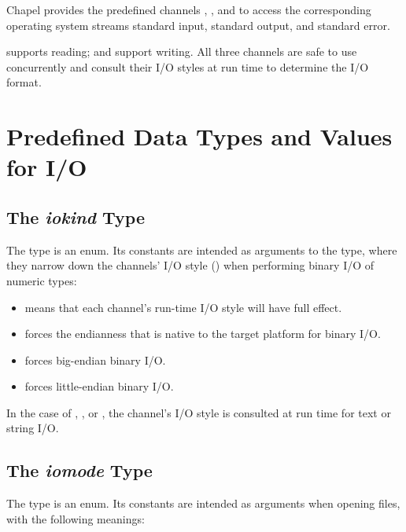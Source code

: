 Chapel provides the predefined channels , ,
and  to access the corresponding operating system streams
standard input, standard output, and standard error.

 supports reading;
 and  support writing.
All three channels are safe to use concurrently and
consult their I/O styles at run time to determine the I/O format.


\section{Predefined Data Types and Values for I/O}
\label{IO_data_types}


\subsection{The {\em iokind} Type}
\label{IO_iokind_type}

The  type is an enum. Its constants are intended
as arguments to the  type,
where they narrow down the channels' I/O style ()
when performing binary I/O of numeric types:

\begin{itemize}

\item {} means that each channel's run-time I/O style will
      have full effect.      

\item {} forces the endianness that is native
      to the target platform for binary I/O.

\item {} forces big-endian binary I/O.

\item {} forces little-endian binary I/O.

\end{itemize}

In the case of , , or ,
the channel's I/O style is consulted at run time for
text or string I/O.


\subsection{The {\em iomode} Type}
\label{IO_iomode_type}

The  type is an enum. Its constants are intended
as arguments when opening files, with the following meanings:


